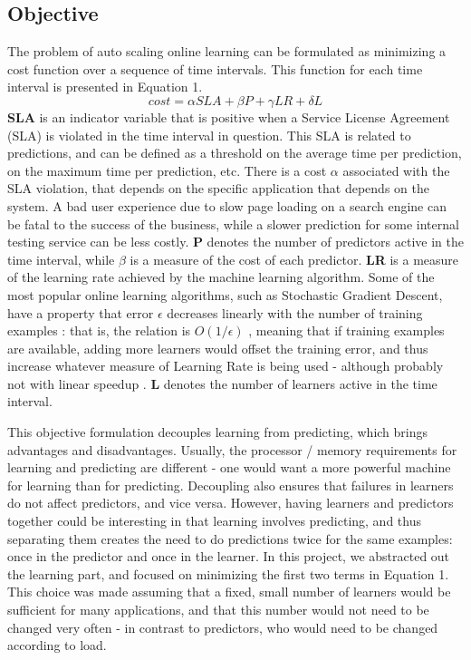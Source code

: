 \documentclass[12pt]{article}
\begin{document}
\subsection{Objective}
The problem of auto scaling online learning can be formulated as minimizing a
cost function over a sequence of time intervals. This function for each time
interval is presented in
Equation 1. 
\begin{equation}
cost = \alpha SLA + \beta P + \gamma LR + \delta L
\end{equation}
\textbf{SLA} is an indicator variable that is positive when a Service License
Agreement (SLA) is violated in the time interval in question. This SLA is
related to predictions, and can be defined as a threshold on the average time
per prediction, on the maximum time per prediction, etc. There is a cost
$\alpha$ associated with the SLA violation, that depends on the specific
application that depends on the system. A bad user experience due to slow
page loading on a search engine can be fatal to the success of the business,
while a slower prediction for some internal testing service can be less costly.
\textbf{P} denotes the number of predictors active in the time interval, while
$\beta$ is a measure of the cost of each predictor. \textbf{LR} is a measure of
the learning rate achieved by the machine learning algorithm. Some of the most
popular online learning algorithms, such as Stochastic Gradient Descent, have a
property that error $\epsilon$ decreases
linearly with the number of training examples
\cite{Nemirovski:2009:RSA:1654243.1654247}: that is, the relation is $O(1 /
\epsilon)$ , meaning that if training examples
are available, adding more learners would offset the training error, and thus
increase whatever measure of Learning Rate is being used - although probably not with
linear speedup \cite{pserver1, pserver2}.  $\textbf{L}$ denotes
the number of learners active in the time interval.

This objective formulation decouples learning from predicting, which brings
advantages and disadvantages. Usually, the processor / memory requirements for
learning and predicting are different - one would want a more powerful machine
for learning than for predicting. Decoupling also ensures that failures in
learners do not affect predictors, and vice versa. However, having learners and
predictors together could be interesting in that learning involves predicting,
and thus separating them creates the need to do predictions twice for the same
examples: once in the predictor and once in the learner. In this project, we
abstracted out the learning part, and focused on minimizing the first two terms
in Equation 1. This choice was made assuming that a fixed, small number of
learners would be sufficient for many applications, and that this number would
not need to be changed very often - in contrast to predictors, who would need to
be changed according to load.
\end{document}
